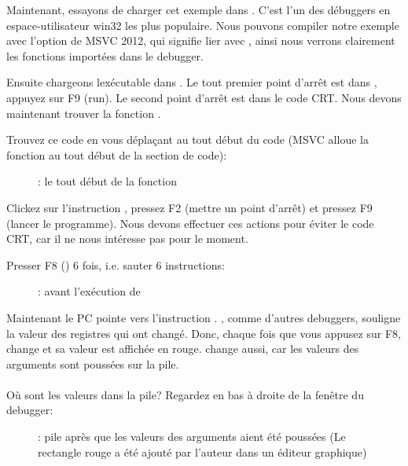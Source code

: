 \clearpage
{}
\myindex{\olly}

Maintenant, essayons de charger cet exemple dans \olly.
C'est l'un des débuggers en espace-utilisateur win32 les plus populaire.
Nous pouvons compiler notre exemple avec l'option  de MSVC 2012, qui signifie
lier avec , ainsi nous verrons clairement les fonctions importées
dans le debugger.

Ensuite chargeons lexécutable dans \olly.
Le tout premier point d'arrêt est dans , appuyez
sur F9 (run).
Le second point d'arrêt est dans le code \ac{CRT}.
Nous devons maintenant trouver la fonction \main.

Trouvez ce code en vous déplaçant au tout début du code (MSVC alloue la fonction
\main au tout début de la section de code):
\begin{figure}[H]
\centering
{}
\caption{\olly: le tout début de la fonction \main}
\label{fig:printf3_olly_1}
\end{figure}

Clickez sur l'instruction , pressez F2 (mettre un point d'arrêt)
et pressez F9 (lancer le programme).
Nous devons effectuer ces actions pour éviter le code \ac{CRT}, car il ne nous intéresse
pas pour le moment.

\clearpage
Presser F8 (\stepover) 6 fois, i.e. sauter 6 instructions:

\begin{figure}[H]
\centering
{}
\caption{\olly: avant l'exécution de \printf}
\label{fig:printf3_olly_2}
\end{figure}

Maintenant le \ac{PC} pointe vers l'instruction .
\olly, comme d'autres debuggers, souligne la valeur des registres qui ont changé.
Donc, chaque fois que vous appusez sur F8, \EIP change et sa valeur est affichée en rouge.
\ESP change aussi, car les valeurs des arguments sont poussées sur la pile.\\
\\
Où sont les valeurs dans la pile?
Regardez en bas à droite de la fenêtre du debugger:

\begin{figure}[H]
\centering

\caption{\olly: pile après que les valeurs des arguments aient été poussées (Le
rectangle rouge a été ajouté par l'auteur dans un éditeur graphique)}
\end{figure}

